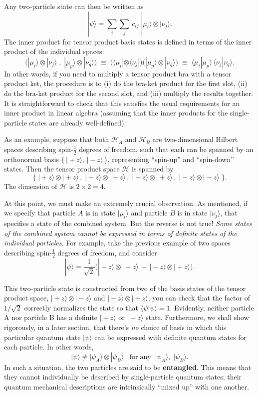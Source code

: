\documentclass[pra,11pt]{revtex4}
\begin{document}
Any two-particle state can then be written as
$$|\psi\rangle = \sum_{i} \sum_{j} \, c_{ij}\; |\mu_i\rangle \otimes |\nu_j\rangle.$$
The inner product for tensor product basis states is defined in terms
of the inner product of the individual spaces:
$$\Big(|\mu_i\rangle \otimes |\nu_j\rangle\;,\; |\mu_p\rangle \otimes |\nu_q\rangle \Big) \;\equiv\; \big(\langle\mu_i| \otimes \langle\nu_j| \big) \big(|\mu_p\rangle \otimes |\nu_q\rangle\big) \;\equiv\; \langle\mu_i|\mu_p\rangle \, \langle\nu_j|\nu_q\rangle.$$
In other words, if you need to multiply a tensor product bra with a
tensor product ket, the procedure is to (i) do the bra-ket product for
the first slot, (ii) do the bra-ket product for the second slot, and
(iii) multiply the results together.  It is straightforward to check
that this satisfies the usual requirements for an inner product in
linear algebra (assuming that the inner products for the
single-particle states are already well-defined).

As an example, suppose that both $\mathscr{H}_A$ and $\mathscr{H}_B$
are two-dimensional Hilbert spaces describing spin-$\frac{1}{2}$
degrees of freedom, such that each can be spanned by an orthonormal
basis $\{\,|\!+\!z\rangle, \,|\!-\!z\rangle \, \}$, representing
``spin-up'' and ``spin-down'' states.  Then the tensor product space
$\mathscr{H}$ is spanned by
$$\Big\{\;|\!+\!z\rangle\otimes|\!+\!z\rangle\,,\; |\!+\!z\rangle\otimes|\!-\!z\rangle\,,\; |\!-z\!\rangle\otimes|\!+\!z\rangle\,,\; |\!-\!z\rangle\otimes|\!-\!z\rangle \;\Big\}.$$
The dimension of $\mathscr{H}$ is $2 \times 2 = 4$.  

At this point, we must make an extremely crucial observation.  As
mentioned, if we specify that particle $A$ is in state $|\mu_i\rangle$
and particle $B$ is in state $|\nu_j\rangle$, that specifies a state
of the combined system.  But the reverse is not true!  \textit{Some
  states of the combined system cannot be expressed in terms of
  definite states of the individual particles.}  For example, take the
previous example of two spaces describing spin-$\frac{1}{2}$ degrees
of freedom, and consider
$$|\psi\rangle = \frac{1}{\sqrt{2}} \Big(|\!+\!z\rangle\otimes|\!-\!z\rangle \,-\, |\!-z\!\rangle\otimes|\!+\!z\rangle\Big).$$

This two-particle state is constructed from two of the basis states of
the tensor product space,
$|\!+\!z\rangle\otimes|\!-\!z\rangle$ and
$|\!-\!z\rangle\otimes|\!+\!z\rangle$; you can check that
the factor of $1/\sqrt{2}$ correctly normalizes the state so that
$\langle\psi|\psi\rangle = 1$.  Evidently, neither particle A nor
particle B has a definite $|\!+\!z\rangle$ or
$|\!-\!z\rangle$ state.  Furthermore, we shall show rigorously,
in a later section, that there's \textit{no} choice of basis in which this
particular quantum state $|\psi\rangle$ can be expressed with
definite quantum states for each particle.  In other words,
$$|\psi\rangle \ne |\psi_A\rangle\otimes|\psi_B\rangle \;\;\;\textrm{for}\;\textrm{any}\;\; |\psi_A\rangle, \;|\psi_B\rangle.$$
In such a situation, the two particles are said to be
\textbf{entangled}.  This means that they cannot individually be
described by single-particle quantum states; their quantum
mechanical descriptions are intrinsically ``mixed up'' with one another.
\end{document}
